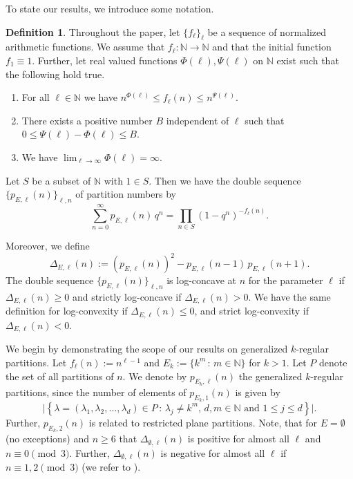 \documentclass[12pt]{amsart}
\theoremstyle{definition}
\newtheorem{definition}{Definition}
\theoremstyle{remark}
\numberwithin{theorem}{section} \numberwithin{equation}{section}
\begin{document}
To state our results, we introduce some notation.
\begin{definition}\label{main:def}
Throughout the paper, let $\{ f_{\ell}\}_{\ell}$ be a sequence of normalized arithmetic functions. We assume that $f_{\ell}: \mathbb{N} \longrightarrow \mathbb{N}$ and that
the initial function $f_1 \equiv 1$.
Further, let
real valued functions $\Phi
\left( {\ell}\right) , \Psi
\left( {\ell}\right)
$ on $\mathbb{N}$ exist such that
the following hold true.
\begin{enumerate}
\item  For all $\ell \in \mathbb{N}$ we have
$n^{\Phi(\ell)} \leq f_{\ell}(n) \leq 
n^{\Psi(\ell)}
$.

\item  There exists a positive number $B
$ independent of $\ell$ such that $ 0 \leq \Psi(\ell) - \Phi(\ell) \leq B
$.
\item  We have $\lim_{\ell \to \infty} \Phi(\ell) = \infty$.
\end{enumerate}

\end{definition}
Let $S$ be a subset of $\mathbb{N}$ with $1 \in S$. Then we
have the double sequence
$\{p_{E,\ell }(n)\}_{\ell,n}$ of partition numbers by
\begin{equation*}\label{exception}
\sum_{n=0}^{\infty} p_{E,\ell }(n) \, q^n = \prod_{n \in S}
\left( 1 - q^n \right)^{-f_{\ell}(n)}.
\end{equation*}


Moreover, we define
\begin{equation*}
\Delta _{E,\ell }(n):= \left(p_{E,\ell }(n) \right)^2 - 
p_{E,\ell }(n-1)\,  p_{E,\ell }(n+1) .
\end{equation*}
The double sequence
$\{p_{E,\ell }(n)\}_{\ell,n}$ is log-concave at $n$ for the parameter $\ell$ if $\Delta _{E,\ell }\left( n\right)
\geq 0$ and strictly log-concave if $\Delta _{E,\ell }(n) > 0$. 
We have the same definition for log-convexity if $\Delta _{E,\ell }(n) \leq 0$, and
strict log-convexity if $\Delta _{E,\ell }(n) < 0$. 
\newline


We begin by demonstrating the scope of our results on generalized 
$k$-regular partitions. Let $f_{\ell}(n):= n^{\ell -1}$ and 
$E_k:=\{k^m\, : \, m \in \mathbb{N} \}$
for $k>1$. Let $P$ denote the set of all partitions of $n$.
We denote by
$p_{E_k,\ell}(n)$ the generalized $k$-regular partitions, since the number of elements of $p_{E_k,1}(n)$ is given by
\begin{equation*}
\Big\vert \left\{ \lambda=(\lambda_1, \lambda_2, \ldots, \lambda_d )\in P \, : \, \lambda_j \neq k^m, \, d,m \in \mathbb{N} \text{ and } 1 \leq j \leq d \right\} \Big\vert.
\end{equation*}
Further, $p_{E_k,2}(n)$ is related to restricted plane partitions.
Note, that for $E=\emptyset$ (no exceptions) and $n\geq 6$ that $\Delta_{\emptyset,\ell}(n)$
is positive for almost all $\ell$ and $n\equiv 0 \pmod{3}$. Further,
$\Delta_{\emptyset,\ell}(n)$ is negative for almost all $\ell$ if $n \equiv 1,2 \pmod{3}$ (we refer to \cite{HN22}).
\end{document}
